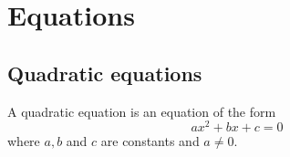 \chapter{Equations}

\section{Quadratic equations}
\begin{dfn}
    A quadratic equation is an equation of the form
    \begin{equation}
        \label{quad}
        ax^2 + bx + c = 0
    \end{equation}
    where \( a, b \) and \( c \) are constants
    and \( a \neq 0 \).
\end{dfn}
